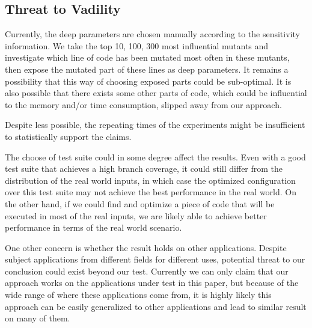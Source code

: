 \subsection{Threat to Vadility}

Currently, the deep parameters are chosen manually according to the sensitivity information. We take the top 10, 100, 300 most influential mutants and investigate which line of code has been mutated most often in these mutants, then expose the mutated part of these lines as deep parameters. It remains a possibility that this way of choosing exposed parts could be sub-optimal. It is also possible that there exists some other parts of code, which could be influential to the memory and/or time consumption, slipped away from our approach. 

Despite less possible, the repeating times of the experiments might be insufficient to statistically support the claims. 

The choose of test suite could in some degree affect the results. Even with a good test suite that achieves a high branch coverage, it could still differ from the distribution of the real world inputs, in which case the optimized configuration over this test suite may not achieve the best performance in the real world. On the other hand, if we could find and optimize a piece of code that will be executed in most of the real inputs, we are likely able to achieve better performance in terms of the real world scenario.

One other concern is whether the result holds on other applications. Despite subject applications from different fields for different uses, potential threat to our conclusion could exist beyond our test. Currently we can only claim that our approach works on the applications under test in this paper, but because of the wide range of where these applications come from, it is highly likely this approach can be easily generalized to other applications and lead to similar result on many of them.
